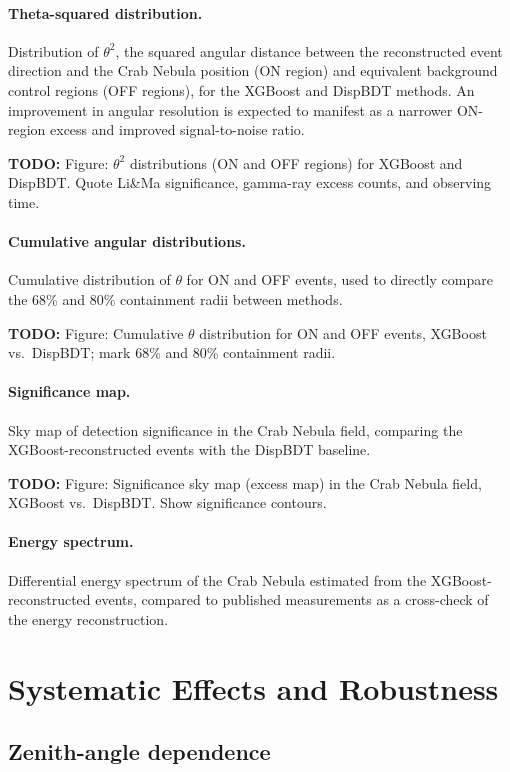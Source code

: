 \documentclass[12pt]{article}
\newcommand{\todo}[1]{\begin{hintBox} \textbf{TODO:} #1 \end{hintBox}}
\begin{document}
\paragraph{Theta-squared distribution.}
Distribution of $\theta^2$, the squared angular distance between the reconstructed
event direction and the Crab Nebula position (ON region) and equivalent background
control regions (OFF regions), for the XGBoost and DispBDT methods.
An improvement in angular resolution is expected to manifest as a narrower
ON-region excess and improved signal-to-noise ratio.
\todo{Figure: $\theta^2$ distributions (ON and OFF regions) for XGBoost and DispBDT. Quote Li\&Ma significance, gamma-ray excess counts, and observing time.}

\paragraph{Cumulative angular distributions.}
Cumulative distribution of $\theta$ for ON and OFF events, used to directly compare
the 68\% and 80\% containment radii between methods.
\todo{Figure: Cumulative $\theta$ distribution for ON and OFF events, XGBoost vs.\ DispBDT; mark 68\% and 80\% containment radii.}

\paragraph{Significance map.}
Sky map of detection significance in the Crab Nebula field,
comparing the XGBoost-reconstructed events with the DispBDT baseline.
\todo{Figure: Significance sky map (excess map) in the Crab Nebula field, XGBoost vs.\ DispBDT. Show significance contours.}

\paragraph{Energy spectrum.}
Differential energy spectrum of the Crab Nebula estimated from the
XGBoost-reconstructed events, compared to published measurements
\citep{2015ICRC...34..792A} as a cross-check of the energy reconstruction.

\section{Systematic Effects and Robustness}
\label{sec:systematics}

\subsection{Zenith-angle dependence}
\end{document}
